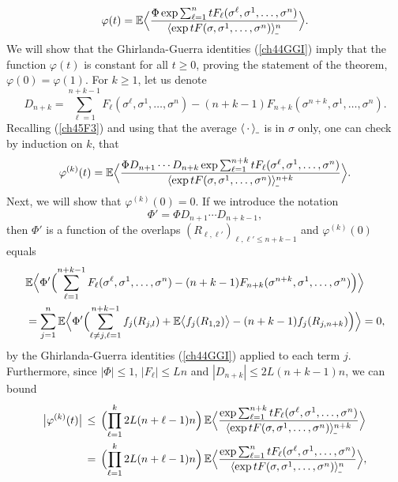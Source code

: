 \documentclass[12pt]{article}
\newcommand{\e}{\mathbb{E}}
\newcommand{\la}{\langle}
\newcommand{\ra}{\rangle}
\theoremstyle{nonumberplain}
\begin{document}
\begin{equation}
\varphi(t) = 
\e\Bigl\la
\frac{\Phi \exp \sum_{\ell=1}^{n} t F_{\ell}(\sigma^{\ell},\sigma^1,\ldots,\sigma^n)}
{\la\exp t F(\sigma,\sigma^1,\ldots,\sigma^n)\ra_{\hspace{-0.3mm}\mathunderscore}^n}
\Bigr\ra.
\label{ch45varphitdefine}
\end{equation}
We will show that the Ghirlanda-Guerra identities (\ref{ch44GGI}) imply that the function $\varphi(t)$ is constant for all $t\geq 0$, proving the statement of the theorem, $\varphi(0)=\varphi(1).$ For $k\geq 1$, let us denote
$$
D_{n+k} = \sum_{\ell=1}^{n+k-1}F_{\ell}(\sigma^{\ell},\sigma^1,\ldots,\sigma^n)
-(n+k-1) F_{n+k}(\sigma^{n+k},\sigma^1,\ldots,\sigma^n).
$$
Recalling (\ref{ch45F3}) and using that the average $\la\,\cdot\,\ra_{\hspace{-0.3mm}\mathunderscore}$ is in $\sigma$ only, one can check by induction on $k$, that
$$
\varphi^{(k)}(t) = 
\e\Bigl\la
\frac{\Phi D_{n+1}\cdots D_{n+k} 
\exp \sum_{\ell=1}^{n+k} t F_{\ell}(\sigma^{\ell},\sigma^1,\ldots,\sigma^n)}
{\la\exp t F(\sigma,\sigma^1,\ldots,\sigma^n)\ra_{\hspace{-0.3mm}\mathunderscore}^{n+k}}
\Bigr\ra.
$$
Next, we will show that $\varphi^{(k)}(0)=0.$ If we introduce the notation 
$$
\Phi' = \Phi D_{n+1}\cdots D_{n+k-1},
$$ 
then $\Phi'$ is a function of the overlaps $(R_{\ell,\ell'})_{\ell,\ell'\leq n+k-1}$ and $\varphi^{(k)}(0)$ equals
\begin{align*}
&
\e\Bigl\la \Phi' \Bigl(
\sum_{\ell=1}^{n+k-1}F_{\ell}(\sigma^{\ell},\sigma^1,\ldots,\sigma^n)
-(n+k-1) F_{n+k}(\sigma^{n+k},\sigma^1,\ldots,\sigma^n)
\Bigr)
\Bigr\ra
\nonumber
\\
& = 
\sum_{j=1}^{n}
\e\Bigl\la \Phi' \Bigl(
\sum_{\ell\not = j,\ell=1}^{n+k-1}f_j(R_{j,l})
+ \e \bigl\la f_j(R_{1,2}) \bigr\ra
-(n+k-1) f_{j}(R_{j,n+k})
\Bigr)
\Bigr\ra
=0,
\end{align*}
by the Ghirlanda-Guerra identities (\ref{ch44GGI}) applied to each term $j$. Furthermore, since $|\Phi|\leq 1$, $|F_{\ell}| \leq L n$ and $|D_{n+k}| \leq 2L (n+k-1)n$, we can bound
\begin{align*}
\bigl|\varphi^{(k)}(t) \bigr|
&\,\leq \,
\Bigl(\prod_{\ell=1}^{k} 2L(n+\ell-1)n\Bigr) \,
\e\Bigl\la
\frac{
\exp \sum_{\ell=1}^{n+k} t F_{\ell}(\sigma^{\ell},\sigma^1,\ldots,\sigma^n)}
{\la\exp t F(\sigma,\sigma^1,\ldots,\sigma^n)\ra_{\hspace{-0.3mm}\mathunderscore}^{n+k}}
\Bigr\ra
\\
&\,=\,
\Bigl(\prod_{\ell=1}^{k} 2L(n+\ell-1)n\Bigr) \,
\e\Bigl\la
\frac{
\exp \sum_{\ell=1}^{n} t F_{\ell}(\sigma^{\ell},\sigma^1,\ldots,\sigma^n)}
{\la\exp t F(\sigma,\sigma^1,\ldots,\sigma^n)\ra_{\hspace{-0.3mm}\mathunderscore}^{n}}
\Bigr\ra,
\end{align*}
\end{document}
